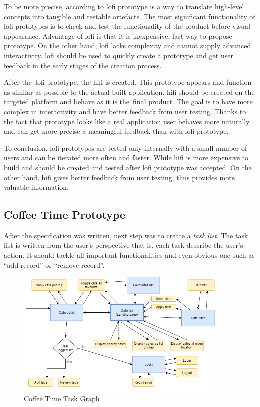 To be more precise, according to \cite{adobe-prototype} \gls{lofi} prototype is a way to translate high-level concepts into tangible and testable artefacts. The most significant  functionality  of \gls{lofi} prototypes is to check and test the functionality of the product before visual appearance. Advantage of \gls{lofi} is that it is inexpensive, fast way to propose prototype. On the other hand, \gls{lofi} lacks complexity and cannot supply advanced interactivity. \gls{lofi} should be used to quickly create a prototype and get user feedback in the early stages of the creation process. 

After the~\gls{lofi} prototype, the \gls{hifi} is created. This prototype appears and function as similar as possible to the actual built application. \gls{hifi} should be created on the targeted platform and behave as it is the~final product. The goal is to have more complex \gls{ui} interactivity and have better feedback from user testing. Thanks to the fact that prototype looks like a real application user behaves more naturally and can get more precise a meaningful feedback than with \gls{lofi} prototype. 

To conclusion, \gls{lofi} prototypes are tested only internally with a small number of users and can be iterated more often and faster. While \gls{hifi} is more expensive to build and should be created and tested after \gls{lofi} prototype was accepted. On the other hand, \gls{hifi} gives better feedback from user testing, thus provides more valuable information.

\subsection{Coffee Time Prototype}
After the specification was written, next step was to create a \textit{task list}. The task list is written from the user's perspective that is, each task describe the user's action. It should tackle all important functionalities and even obvious one such as ``add record'' or ``remove record''.

\begin{figure}[htp]
    \centering
    \includegraphics[width=0.9\textwidth]{img/analysis/task-list-graph.png}
    \caption{Coffee Time Task Graph}
    \label{fig:task-graph}
\end{figure}

